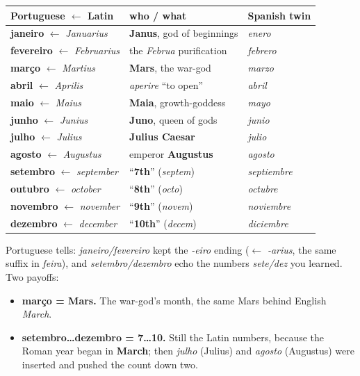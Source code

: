\begin{cousinweb}
\noindent
\begin{tabularx}{\linewidth}{@{}>{\raggedright\arraybackslash}X>{\raggedright\arraybackslash}X>{\raggedright\arraybackslash}X@{}}
\toprule
\textbf{Portuguese $\leftarrow$ Latin} & \textbf{who / what} & \textbf{Spanish twin} \\
\midrule
\textbf{janeiro} $\leftarrow$ \emph{Januarius} & \textbf{Janus}, god of beginnings & \emph{enero} \\
\textbf{fevereiro} $\leftarrow$ \emph{Februarius} & the \emph{Februa} purification & \emph{febrero} \\
\textbf{março} $\leftarrow$ \emph{Martius} & \textbf{Mars}, the war-god & \emph{marzo} \\
\textbf{abril} $\leftarrow$ \emph{Aprilis} & \emph{aperire} \textquotedblleft{}to open\textquotedblright{} & \emph{abril} \\
\textbf{maio} $\leftarrow$ \emph{Maius} & \textbf{Maia}, growth-goddess & \emph{mayo} \\
\textbf{junho} $\leftarrow$ \emph{Junius} & \textbf{Juno}, queen of gods & \emph{junio} \\
\textbf{julho} $\leftarrow$ \emph{Julius} & \textbf{Julius Caesar} & \emph{julio} \\
\textbf{agosto} $\leftarrow$ \emph{Augustus} & emperor \textbf{Augustus} & \emph{agosto} \\
\textbf{setembro} $\leftarrow$ \emph{september} & \textquotedblleft{}\textbf{7th}\textquotedblright{} (\emph{septem}) & \emph{septiembre} \\
\textbf{outubro} $\leftarrow$ \emph{october} & \textquotedblleft{}\textbf{8th}\textquotedblright{} (\emph{octo}) & \emph{octubre} \\
\textbf{novembro} $\leftarrow$ \emph{november} & \textquotedblleft{}\textbf{9th}\textquotedblright{} (\emph{novem}) & \emph{noviembre} \\
\textbf{dezembro} $\leftarrow$ \emph{december} & \textquotedblleft{}\textbf{10th}\textquotedblright{} (\emph{decem}) & \emph{diciembre} \\
\bottomrule
\end{tabularx}

Portuguese tells: \emph{janeiro/fevereiro} kept the \emph{-eiro} ending ($\leftarrow$ \emph{-arius}, the same suffix in \emph{feira}), and \emph{setembro/dezembro} echo the numbers \emph{sete/dez} you learned. Two payoffs:

\begin{itemize}
\raggedright
  \item \textbf{março = Mars.} The war-god's month, the same Mars behind English \emph{March}.
  \item \textbf{setembro…dezembro = 7…10.} Still the Latin numbers, because the Roman year began in \textbf{March}; then \emph{julho} (Julius) and \emph{agosto} (Augustus) were inserted and pushed the count down two.
\end{itemize}
\end{cousinweb}

